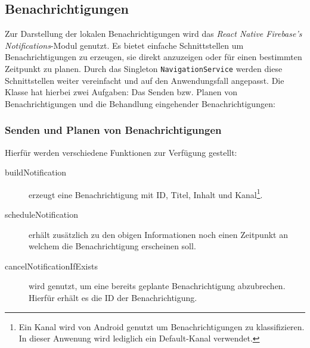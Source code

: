 

\subsection{Benachrichtigungen}\label{sec:besonderheiten-benachrichtigung}
Zur Darstellung der lokalen Benachrichtigungen wird das \emph{React Native Firebase's Notifications}-Modul genutzt.
Es bietet einfache Schnittstellen um Benachrichtigungen zu erzeugen,
sie direkt anzuzeigen oder für einen bestimmten Zeitpunkt zu planen.
Durch das Singleton \texttt{NavigationService} werden diese Schnittstellen weiter vereinfacht und auf den Anwendungsfall angepasst.
Die Klasse hat hierbei zwei Aufgaben: Das Senden bzw. Planen von Benachrichtigungen und die Behandlung eingehender Benachrichtigungen:

\subsubsection{Senden und Planen von Benachrichtigungen}
Hierfür werden verschiedene Funktionen zur Verfügung gestellt:
\begin{description}
    \item[buildNotification] erzeugt eine Benachrichtigung mit ID, Titel, Inhalt und Kanal\footnote{Ein Kanal wird von Android genutzt um Benachrichtigungen zu klassifizieren. In dieser Anwenung wird lediglich ein Default-Kanal verwendet.}.
    \item[scheduleNotification] erhält zusätzlich zu den obigen Informationen noch einen Zeitpunkt an welchem die Benachrichtigung erscheinen soll.
    \item[cancelNotificationIfExists] wird genutzt, um eine bereits geplante Benachrichtigung abzubrechen. Hierfür erhält es die ID der Benachrichtigung.
\end{description}

